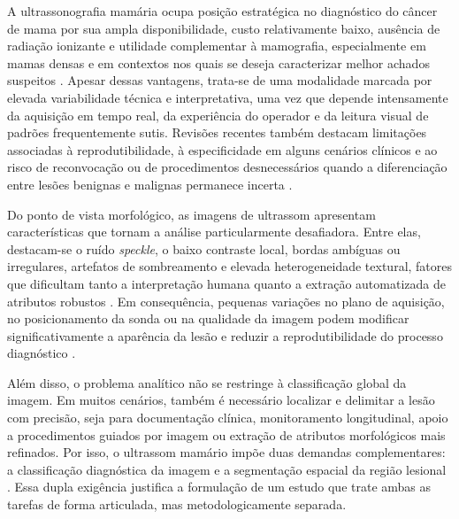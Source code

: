 \documentclass[tcc,capa]{texufpel}
\begin{document}
A ultrassonografia mamária ocupa posição estratégica no diagnóstico do câncer de mama por sua ampla disponibilidade, custo relativamente baixo, ausência de radiação ionizante e utilidade complementar à mamografia, especialmente em mamas densas e em contextos nos quais se deseja caracterizar melhor achados suspeitos \cite{Guo2018,Iacob2024}. Apesar dessas vantagens, trata-se de uma modalidade marcada por elevada variabilidade técnica e interpretativa, uma vez que depende intensamente da aquisição em tempo real, da experiência do operador e da leitura visual de padrões frequentemente sutis. Revisões recentes também destacam limitações associadas à reprodutibilidade, à especificidade em alguns cenários clínicos e ao risco de reconvocação ou de procedimentos desnecessários quando a diferenciação entre lesões benignas e malignas permanece incerta \cite{Iacob2024,Boca2021,Ren2023}.

Do ponto de vista morfológico, as imagens de ultrassom apresentam características que tornam a análise particularmente desafiadora. Entre elas, destacam-se o ruído \textit{speckle}, o baixo contraste local, bordas ambíguas ou irregulares, artefatos de sombreamento e elevada heterogeneidade textural, fatores que dificultam tanto a interpretação humana quanto a extração automatizada de atributos robustos \cite{Zhang2022BUSIS,Liu2018,Yap2018}. Em consequência, pequenas variações no plano de aquisição, no posicionamento da sonda ou na qualidade da imagem podem modificar significativamente a aparência da lesão e reduzir a reprodutibilidade do processo diagnóstico \cite{Guo2018,Iacob2024}.

Além disso, o problema analítico não se restringe à classificação global da imagem. Em muitos cenários, também é necessário localizar e delimitar a lesão com precisão, seja para documentação clínica, monitoramento longitudinal, apoio a procedimentos guiados por imagem ou extração de atributos morfológicos mais refinados. Por isso, o ultrassom mamário impõe duas demandas complementares: a classificação diagnóstica da imagem e a segmentação espacial da região lesional \cite{Zhang2022BUSIS,Liu2018,Yap2018}. Essa dupla exigência justifica a formulação de um estudo que trate ambas as tarefas de forma articulada, mas metodologicamente separada.
\end{document}
